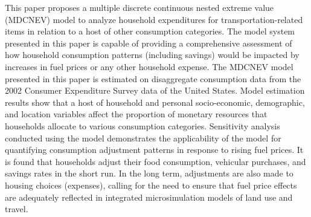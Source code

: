 This paper proposes a multiple discrete continuous nested extreme value (MDCNEV) model to analyze household expenditures for transportation-related items in relation to a host of other consumption categories. The model system presented in this paper is capable of providing a comprehensive assessment of how household consumption patterns (including savings) would be impacted by increases in fuel prices or any other household expense. The MDCNEV model presented in this paper is estimated on disaggregate consumption data from the 2002 Consumer Expenditure Survey data of the United States. Model estimation results show that a host of household and personal socio-economic, demographic, and location variables affect the proportion of monetary resources that households allocate to various consumption categories. Sensitivity analysis conducted using the model demonstrates the applicability of the model for quantifying consumption adjustment patterns in response to rising fuel prices. It is found that households adjust their food consumption, vehicular purchases, and savings rates in the short run. In the long term, adjustments are also made to housing choices (expenses), calling for the need to ensure that fuel price effects are adequately reflected in integrated microsimulation models of land use and travel.